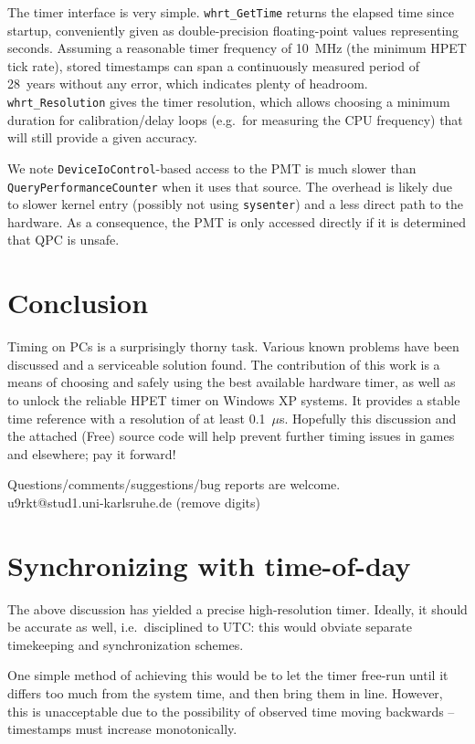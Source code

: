 \documentclass[a4paper,12pt,pdftex]{article}
\newcommand{\id}[1]{\texttt{#1}}
\begin{document}
The timer interface is very simple. \id{whrt\_GetTime} returns the elapsed time since startup, conveniently given as double-precision floating-point values representing seconds. Assuming a reasonable timer frequency of 10~MHz (the minimum HPET tick rate), stored timestamps can span a continuously measured period of 28~years without any error, which indicates plenty of headroom. \id{whrt\_Resolution} gives the timer resolution, which allows choosing a minimum duration for calibration/delay loops (e.g.\ for measuring the CPU frequency) that will still provide a given accuracy.

We note \id{DeviceIoControl}-based access to the PMT is much slower than \id{QueryPerformanceCounter} when it uses that source. The overhead is likely due to slower kernel entry (possibly not using \id{sysenter}) and a less direct path to the hardware. As a consequence, the PMT is only accessed directly if it is determined that QPC is unsafe.


\section{Conclusion}
\label{sec:conclusion}

Timing on PCs is a surprisingly thorny task. Various known problems have been discussed and a serviceable solution found. The contribution of this work is a means of choosing and safely using the best available hardware timer, as well as to unlock the reliable HPET timer on Windows XP systems. It provides a stable time reference with a resolution of at least 0.1~$\mu$s.
Hopefully this discussion and the attached (Free) source code will help prevent further timing issues in games and elsewhere; pay it forward!

Questions/comments/suggestions/bug reports are welcome.\\
u9rkt@stud1.uni-karlsruhe.de (remove digits)

\appendix

\section{Synchronizing with time-of-day}

\label{sec:syncUTC}

The above discussion has yielded a precise high-resolution timer. Ideally, it should be accurate as well, i.e.\ disciplined to UTC: this would obviate separate timekeeping and synchronization schemes.

One simple method of achieving this would be to let the timer free-run until it differs too much from the system time, and then bring them in line. However, this is unacceptable due to the possibility of observed time moving backwards -- timestamps must increase monotonically.
\end{document}
